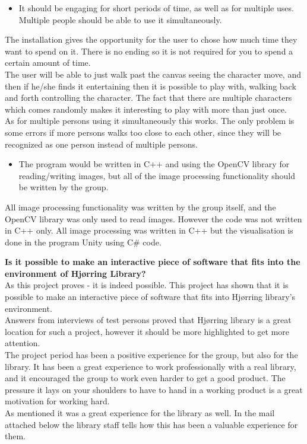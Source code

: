\begin{itemize}
\item It should be engaging for short periods of time, as well as for multiple uses. Multiple people should be able to use it simultaneously.
\end{itemize}
The installation gives the opportunity for the user to chose how much time they want to spend on it. There is no ending so it is not required for you to spend a certain amount of time. \\
The user will be able to just walk past the canvas seeing the character move, and then if he/she finds it entertaining then it is possible to play with, walking back and forth controlling the character. The fact that there are multiple characters which comes randomly makes it interesting to play with more than just once.\\
As for multiple persons using it simultaneously this works. The only problem is some errors if more persons walks too close to each other, since they will be recognized as one person instead of multiple persons.

\begin{itemize}
\item The program would be written in C++ and using the OpenCV library for reading/writing images, but all of the image processing functionality should be written by the group.
\end{itemize}
All image processing functionality was written by the group itself, and the OpenCV library was only used to read images. However the code was not written in C++ only. All image processing was written in C++ but the visualisation is done in the program Unity using C\# code.

\textbf{Is it possible to make an interactive piece of software that fits into the environment of Hj{\o}rring Library?}\\
As this project proves - it is indeed possible. This project has shown that it is possible to make an interactive piece of software that fits into Hj{\o}rring library's environment.\\
Answers from interviews of test persons proved that Hj{\o}rring library is a great location for such a project, however it should be more highlighted to get more attention. \\
The project period has been a positive experience for the group, but also for the library. It has been a great experience to work professionally with a real library, and it encouraged the group to work even harder to get a good product. The pressure it lays on your shoulders to have to hand in a working product is a great motivation for working hard. \\
As mentioned it was a great experience for the library as well. In the mail attached below the library staff tells how this has been a valuable experience for them.

